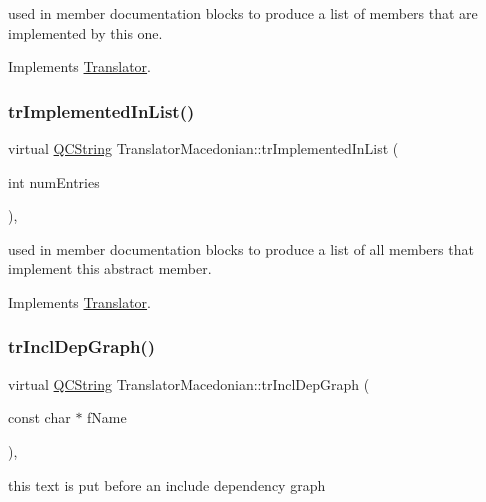 used in member documentation blocks to produce a list of members that are implemented by this one. 

Implements \mbox{\hyperlink{class_translator}{Translator}}.

\mbox{\label{class_translator_macedonian_a169794fb791c6dde04441d08ed533dc7}} 
\subsubsection{\texorpdfstring{trImplementedInList()}{trImplementedInList()}}
{\footnotesize\ttfamily virtual \mbox{\hyperlink{class_q_c_string}{Q\+C\+String}} Translator\+Macedonian\+::tr\+Implemented\+In\+List (\begin{DoxyParamCaption}\item[{int}]{num\+Entries }\end{DoxyParamCaption})\hspace{0.3cm}{\ttfamily [inline]}, {\ttfamily [virtual]}}

used in member documentation blocks to produce a list of all members that implement this abstract member. 

Implements \mbox{\hyperlink{class_translator}{Translator}}.

\mbox{\label{class_translator_macedonian_a2315ed36747549f4803871bf783488f5}} 
\subsubsection{\texorpdfstring{trInclDepGraph()}{trInclDepGraph()}}
{\footnotesize\ttfamily virtual \mbox{\hyperlink{class_q_c_string}{Q\+C\+String}} Translator\+Macedonian\+::tr\+Incl\+Dep\+Graph (\begin{DoxyParamCaption}\item[{const char $\ast$}]{f\+Name }\end{DoxyParamCaption})\hspace{0.3cm}{\ttfamily [inline]}, {\ttfamily [virtual]}}

this text is put before an include dependency graph 

